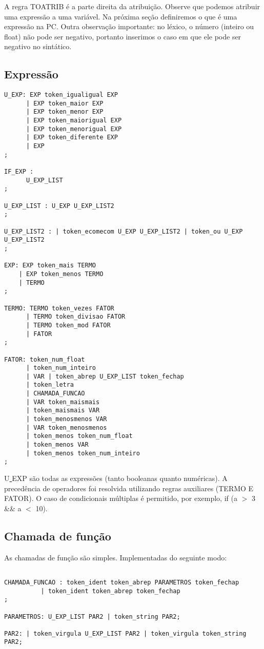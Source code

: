 \documentclass[a4paper,10pt]{article}
\begin{document}
A regra TOATRIB é a parte direita da atribuição. Observe que podemos atribuir uma expressão a uma variável. Na próxima seção definiremos o que é uma expressão na PC.
Outra observação importante: no léxico, o número (inteiro ou float) não pode ser negativo, portanto inserimos o caso em que ele pode ser negativo no sintático.

\subsection{Expressão}
\begin{verbatim}
U_EXP: EXP token_igualigual EXP
      | EXP token_maior EXP
      | EXP token_menor EXP
      | EXP token_maiorigual EXP
      | EXP token_menorigual EXP
      | EXP token_diferente EXP
      | EXP
;

IF_EXP :
      U_EXP_LIST
;

U_EXP_LIST : U_EXP U_EXP_LIST2
;

U_EXP_LIST2 : | token_ecomecom U_EXP U_EXP_LIST2 | token_ou U_EXP U_EXP_LIST2
;

EXP: EXP token_mais TERMO
    | EXP token_menos TERMO
    | TERMO
;

TERMO: TERMO token_vezes FATOR
      | TERMO token_divisao FATOR
      | TERMO token_mod FATOR
      | FATOR
;

FATOR: token_num_float 
	  | token_num_inteiro 
	  | VAR | token_abrep U_EXP_LIST token_fechap 
	  | token_letra 
	  | CHAMADA_FUNCAO
	  | VAR token_maismais
	  | token_maismais VAR
	  | token_menosmenos VAR
	  | VAR token_menosmenos
	  | token_menos token_num_float
	  | token_menos VAR
	  | token_menos token_num_inteiro
;

\end{verbatim}

U\underline{ }EXP são todas as expressões (tanto booleanas quanto numéricas). A precedência de operadores foi resolvida utilizando regras auxiliares (TERMO E FATOR).
O caso de condicionais múltiplas é permitido, por exemplo, if (a $>$ 3 \&\& a $<$ 10).

\subsection{Chamada de função}

As chamadas de função são simples. Implementadas do seguinte modo:

\begin{verbatim}

CHAMADA_FUNCAO : token_ident token_abrep PARAMETROS token_fechap
		  | token_ident token_abrep token_fechap
;

PARAMETROS: U_EXP_LIST PAR2 | token_string PAR2;

PAR2: | token_virgula U_EXP_LIST PAR2 | token_virgula token_string PAR2;

\end{verbatim}
\end{document}
